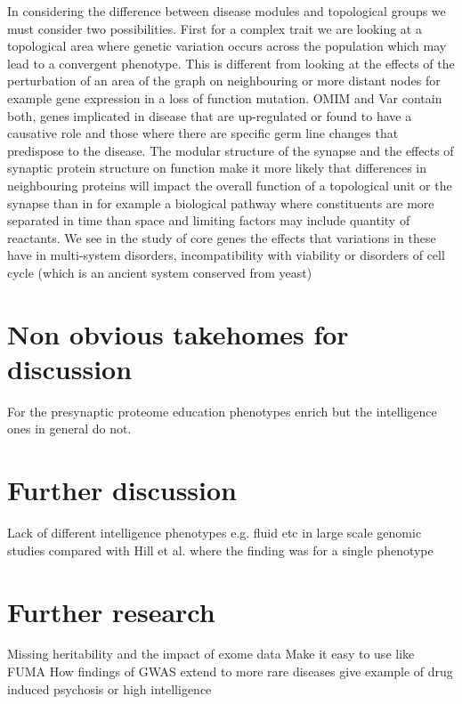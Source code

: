 In considering the difference between disease modules and topological groups we must consider two possibilities. First for a complex trait we are looking at a topological area where genetic variation occurs across the population which may lead to a convergent phenotype. This is different from looking at the effects of the perturbation of an area of the graph on neighbouring or more distant nodes for example gene expression in a loss of function mutation. OMIM and Var contain both, genes implicated in disease that are up-regulated or found to have a causative role and those where there are specific germ line changes that predispose to the disease. The modular structure of the synapse and the effects of synaptic protein structure on function make it more likely that differences in neighbouring proteins will impact the overall function of a topological unit or the synapse than in for example a biological pathway where constituents are more separated in time than space and limiting factors may include quantity of reactants. We see in the study of core genes the effects that variations in these have in multi-system disorders, incompatibility with viability or disorders of cell cycle (which is an ancient system conserved from yeast)
\section{Non obvious takehomes for discussion}

For the presynaptic proteome education phenotypes enrich but the intelligence ones in general do not. 

\section{Further discussion}
Lack of different intelligence phenotypes e.g. fluid etc in large scale genomic studies compared with Hill et al. where the finding was for a single phenotype
\section{Further research}
Missing heritability and the impact of exome data
Make it easy to use like FUMA
How findings of GWAS extend to more rare diseases give example of drug induced psychosis or high intelligence